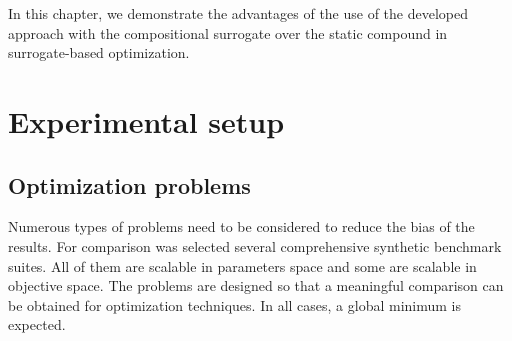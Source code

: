 In this chapter, we demonstrate the advantages of the use of the developed approach with the compositional surrogate over the static compound in surrogate-based optimization.



\section{Experimental setup}

    \subsection{Optimization problems}
    Numerous types of problems need to be considered to reduce the bias of the results. For comparison was selected several comprehensive synthetic benchmark suites. All of them are scalable in parameters space and some are scalable in objective space. The problems are designed so that a meaningful comparison can be obtained for optimization techniques. In all cases, a global minimum is expected.

